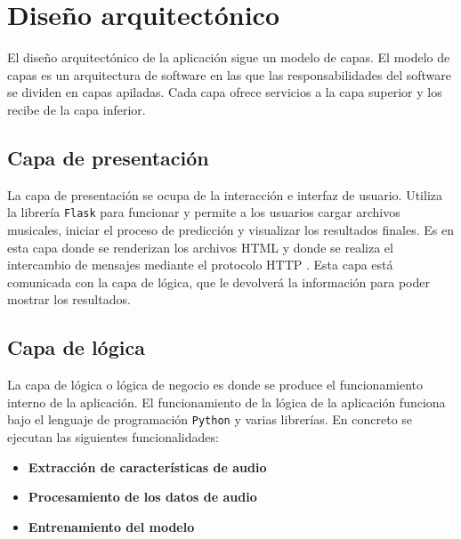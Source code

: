 
\section{Diseño arquitectónico}

El diseño arquitectónico de la aplicación sigue un modelo de capas. \cite{Blancarte}
El modelo de capas es un arquitectura de software en las que las responsabilidades del software se dividen en capas apiladas. Cada capa ofrece servicios a la capa superior y los recibe de la capa inferior.

\subsection{Capa de presentación}

La capa de presentación se ocupa de la interacción e interfaz de usuario. Utiliza la librería \texttt{Flask} para funcionar y permite a los usuarios cargar archivos musicales, iniciar el proceso de predicción y visualizar los resultados finales.
Es en esta capa donde se renderizan los archivos HTML \cite{HTML_tutorial} y donde se realiza el intercambio de mensajes mediante el protocolo HTTP \cite{MozDevNet}. Esta capa está comunicada con la capa de lógica, que le devolverá la información para poder mostrar los resultados.

\subsection{Capa de lógica}

La capa de lógica o lógica de negocio es donde se produce el funcionamiento interno de la aplicación. El funcionamiento de la lógica de la aplicación funciona bajo el lenguaje de programación \texttt{Python} y varias librerías. En concreto se ejecutan las siguientes funcionalidades:

\begin{itemize}
\tightlist

\item \textbf{Extracción de características de audio}

\item \textbf{Procesamiento de los datos de audio}

\item \textbf{Entrenamiento del modelo}

\end{itemize}


